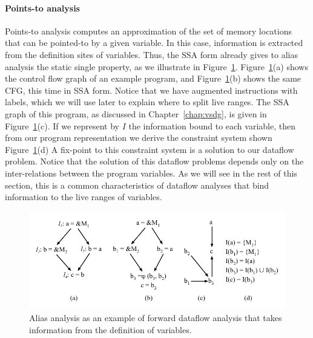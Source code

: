 \paragraph{Points-to analysis}
Points-to analysis computes an approximation of the set of memory locations that
can be pointed-to by a given variable.
In this case, information is extracted from the definition sites of
variables.
Thus, the SSA form already gives to alias analysis the static single property,
as we illustrate in Figure~\ref{fig:aliasAnalysis}.
Figure~\ref{fig:aliasAnalysis}(a) shows the control flow graph of an 
example program, and Figure~\ref{fig:aliasAnalysis}(b) shows the same CFG,
this time in SSA form.
Notice that we have augmented instructions with labels, which we will use later
to explain where to split live ranges.
The SSA graph of this program, as discussed in Chapter~\ref{chap:vsdg}, is given
in Figure~\ref{fig:aliasAnalysis}(c).
If we represent by $I$ the information bound to each variable, then from our
program representation we derive the constraint system shown
Figure~\ref{fig:aliasAnalysis}(d)
A fix-point to this constraint system is a solution to our dataflow problem.
Notice that the solution of this dataflow problems depends only on the
inter-relations between the program variables.
As we will see in the rest of this section, this is a common characteristics of
dataflow analyses that bind information to the live ranges of variables.


\begin{figure}[t!]
\centering
\includegraphics[width=\linewidth]{aliasAnalysis}
\caption{Alias analysis as an example of forward dataflow analysis that takes information from the definition of variables.}
\label{fig:aliasAnalysis}
\end{figure}


